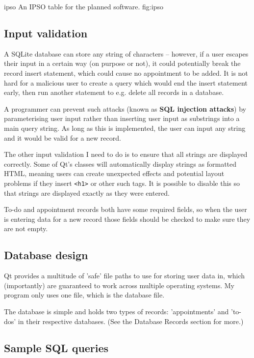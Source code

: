 \addfigure
    {ipso}
    {An IPSO table for the planned software.}
    {fig:ipso}


\subsection{Input validation}

A SQLite database can store any string of characters -- however, if a
user escapes their input in a certain way (on purpose or not), it could
potentially break the record insert statement, which could cause no appointment
to be added. It is not hard for a malicious user to create a query which would
end the insert statement early, then run another statement to e.g. delete all
records in a database.

A programmer can prevent such attacks (known as \textbf{SQL injection
attacks}) by parameterising user input rather than inserting user input as
substrings into a main query string. As long as this is implemented, the user
can input any string and it would be valid for a new record.

The other input validation I need to do is to ensure that all strings are
displayed correctly. Some of Qt's classes will automatically display strings as
formatted HTML, meaning users can create unexpected effects and potential layout
problems if they insert \texttt{<h1>} or other such tags. It is possible to
disable this so that strings are displayed exactly as they were entered.

To-do and appointment records both have some required fields, so when the user
is entering data for a new record those fields should be checked to make sure
they are not empty.


\subsection{Database design}

Qt provides a multitude of 'safe' file paths to use for storing user data in,
which (importantly) are guaranteed to work across multiple operating systems. My
program only uses one file, which is the database file.

The database is simple and holds two types of records: 'appointments' and
'to-dos' in their respective databases. (See the Database Records section for
more.)


\subsection{Sample SQL queries}

